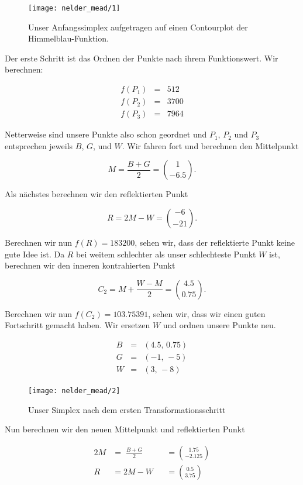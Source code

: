 \documentclass[naustrian]{article}
\begin{document}
{\begin{figure}[H]
    \centering
    \texttt{[image: nelder\_mead/1]}
    \caption{Unser Anfangssimplex aufgetragen auf einen Contourplot der Himmelblau-Funktion.}
\end{figure}

Der erste Schritt ist das Ordnen der Punkte nach ihrem Funktionswert. Wir berechnen:

\begin{eqnarray*}
    f(P_{1}) & = & 512\\
    f(P_{2}) & = & 3700\\
    f(P_{3}) & = & 7964
\end{eqnarray*}

Netterweise sind unsere Punkte also schon geordnet und $P_{1}$, $P_{2}$ und
$P_{3}$ entsprechen jeweils $B$, $G$, und $W$. Wir fahren fort und berechnen
den Mittelpunkt

\[
    M = \frac{B + G}{2} = \binom{1}{-6.5}.
\]

Als nächstes berechnen wir den reflektierten Punkt

\[
    R = 2M - W = \binom{-6}{-21}.
\]

Berechnen wir nun $f(R) = 183200$, sehen wir, dass der reflektierte Punkt keine
gute Idee ist. Da $R$ bei weitem schlechter als unser schlechteste Punkt $W$
ist, berechnen wir den inneren kontrahierten Punkt

\[
    C_{2} = M + \frac{W - M}{2} = \binom{4.5}{0.75}.
\]

Berechnen wir nun $f(C_{2}) = 103.75391$, sehen wir, dass
wir einen guten Fortschritt gemacht haben. Wir ersetzen
$W$ und ordnen unsere Punkte neu.

\begin{eqnarray*}
    B & = & (4.5, \, 0.75)\\
    G & = & (-1,\,-5)\\
    W & = & (3,\,-8)
\end{eqnarray*}

\begin{figure}[H]
    \centering
    \texttt{[image: nelder\_mead/2]}
    \caption{Unser Simplex nach dem ersten Transformationsschritt}
\end{figure}

Nun berechnen wir den neuen Mittelpunkt und reflektierten Punkt

\begin{alignat*}{2}
    M &= \;\frac{B + G}{2} &&= \binom{1.75}{-2.125}\\
    R &= 2M - W &&= \binom{0.5}{3.75}
\end{alignat*}

}
\end{document}
